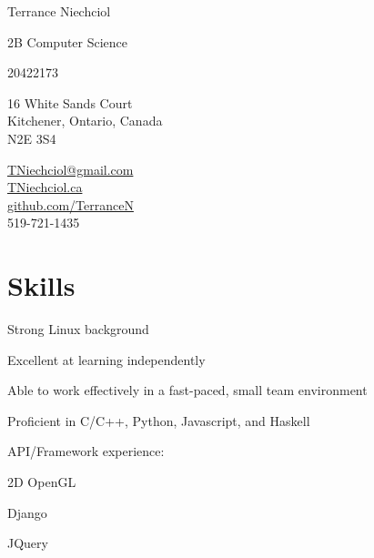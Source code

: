 \documentclass[10pt,letterpaper]{article}
\begin{document}
\begin{center}
{\Huge Terrance Niechciol}

2B Computer Science

20422173
\end{center}

\begin{minipage}[t]{0.5\textwidth}
\begin{center}
16 White Sands Court\\
Kitchener, Ontario, Canada\\
N2E 3S4\\
\end{center}
\end{minipage} %
\begin{minipage}[t]{0.5\textwidth}
\begin{center}
\href{mailto:TNiechciol@gmail.com}{TNiechciol@gmail.com}\\
\href{http://TNiechciol.ca}{TNiechciol.ca}\\
\href{https://github.com/TerranceN}{github.com/TerranceN}\\
519-721-1435\\
\end{center}
\end{minipage}

\section*{Skills}
    \begin{description}
        \item Strong Linux background
        \item Excellent at learning independently
        \item Able to work effectively in a fast-paced, small team environment
        \item Proficient in C/C++, Python, Javascript, and Haskell
        \item API/Framework experience:
        \begin{description}
            \item 2D OpenGL
            \item Django
            \item JQuery
        \end{description}
    \end{description}
\end{document}

